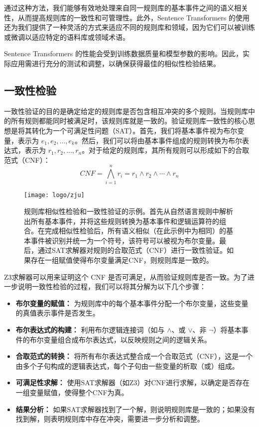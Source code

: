 通过这种方法，我们能够有效地处理来自同一规则库的基本事件之间的语义相关性，从而提高规则库的一致性和可管理性。此外，Sentence Transformers 的使用还为我们提供了一种灵活的方式来适应不同的规则库和领域，因为它们可以被训练或微调以适应特定的语料库或领域术语。

Sentence Transformers 的性能会受到训练数据质量和模型参数的影响。因此，实际应用需进行充分的测试和调整，以确保获得最佳的相似性检验结果。

\subsection{一致性检验}

一致性验证的目的是确定给定的规则库是否包含相互冲突的多个规则。当规则库中的所有规则都能同时被满足时，该规则库就是一致的。验证规则库一致性的核心思想是将其转化为一个可满足性问题（SAT）。首先，我们将基本事件视为布尔变量，表示为 $e_1, e_2, \ldots, e_k$。然后，我们可以将由基本事件组成的规则转换为布尔表达式，表示为 $r_1, r_2, \ldots, r_n$。对于给定的规则库，其所有规则可以形成如下的合取范式（CNF）：
$$CNF=\bigwedge_{i=1}^{n}r_i=r_1 \land r_2 \land \cdots \land r_n$$

\begin{figure}[!t]
    \centering
    \texttt{[image: logo/zju]}
    \caption{规则库相似性检验和一致性验证的示例。首先从自然语言规则中解析出所有基本事件，并将这些规则转换为基本事件和逻辑运算符的组合。在完成相似性检验后，所有语义相似（在此示例中为相同）的基本事件被识别并统一为一个符号，该符号可以被视为布尔变量。最后，通过SAT求解器对规则的合取范式（CNF）进行一致性验证。如果存在一组赋值使得布尔变量满足CNF，则规则库是一致的。}
    \label{fig_1}
\end{figure}

Z3求解器可以用来证明这个 CNF 是否可满足，从而验证规则库是否一致。为了进一步说明一致性检验的过程，我们可以将其分解为以下几个步骤：

\begin{itemize}
    \item \textbf{布尔变量的赋值：} 为规则库中的每个基本事件分配一个布尔变量，这些变量的真值表示事件是否发生。
    \item \textbf{布尔表达式的构建：} 利用布尔逻辑连接词（如与 $\land$、或 $\lor$、非 $\neg$）将基本事件的布尔变量组合成布尔表达式，以反映规则之间的逻辑关系。
    \item \textbf{合取范式的转换：} 将所有布尔表达式整合成一个合取范式（CNF），这是一个由多个子句构成的逻辑表达式，每个子句由一些变量的析取（或）组成。
    \item \textbf{可满足性求解：} 使用SAT求解器（如Z3）对CNF进行求解，以确定是否存在一组变量赋值，使得整个CNF为真。
    \item \textbf{结果分析：} 如果SAT求解器找到了一个解，则说明规则库是一致的；如果没有找到解，则表明规则库中存在冲突，需要进一步分析和调整。
\end{itemize}

